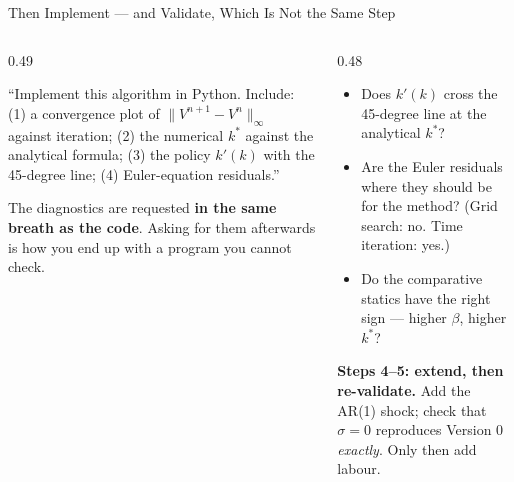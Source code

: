 \begin{frame}{Then Implement --- and Validate, Which Is Not the Same Step}
\begin{columns}[T]
\begin{column}{0.49\textwidth}
\begin{conceptbox}[title=\textbf{Step 2: implement, with diagnostics}]\footnotesize
``Implement this algorithm in Python. Include: (1) a convergence plot of $\lVert V^{n+1}-V^{n}\rVert_\infty$ against iteration; (2) the numerical $k^{*}$ against the analytical formula; (3) the policy $k'(k)$ with the 45-degree line; (4) Euler-equation residuals.''
\end{conceptbox}
\vspace{-1mm}
\footnotesize
The diagnostics are requested \textbf{in the same breath as the code}. Asking for them afterwards is how you end up with a program you cannot check.
\end{column}
\begin{column}{0.48\textwidth}
\begin{takeawaybox}[title=\textbf{Step 3: validate --- your job}]\footnotesize
\begin{itemize}
  \item Does $k'(k)$ cross the 45-degree line at the analytical $k^{*}$?
  \item Are the Euler residuals where they should be for the method? (Grid search: no. Time iteration: yes.)
  \item Do the comparative statics have the right sign --- higher $\beta$, higher $k^{*}$?
\end{itemize}
\end{takeawaybox}
\vspace{-1mm}
\begin{examplebox}\footnotesize
\textbf{Steps 4--5: extend, then re-validate.} Add the AR(1) shock; check that $\sigma=0$ reproduces Version 0 \emph{exactly}. Only then add labour.
\end{examplebox}
\end{column}
\end{columns}
\vspace{1mm}
\end{frame}

